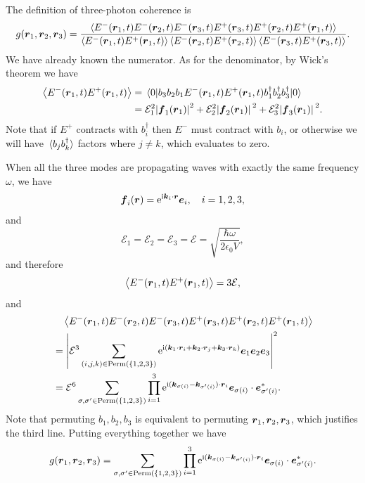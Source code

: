 \documentclass[hyperref, a4paper]{article}
\newcommand*{\ii}{\mathrm{i}}
\newcommand*{\ee}{\mathrm{e}}
\begin{document}
The definition of three-photon coherence is 
\begin{equation}
    g(\vb*{r}_1, \vb*{r}_2, \vb*{r}_3) = \frac{\expval{E^-(\vb*{r}_1, t) E^-(\vb*{r}_2, t) E^-(\vb*{r}_3, t) E^+(\vb*{r}_3, t) E^+(\vb*{r}_2, t) E^+(\vb*{r}_1, t)}}{\expval{E^-(\vb*{r}_1, t) E^+(\vb*{r}_1, t)} \expval{E^-(\vb*{r}_2, t) E^+(\vb*{r}_2, t)} \expval{E^-(\vb*{r}_3, t) E^+(\vb*{r}_3, t)}}.
\end{equation}
We have already known the numerator. As for the denominator, by Wick's theorem we have
\begin{equation}
    \begin{aligned}
        \expval{E^-(\vb*{r}_1, t) E^+(\vb*{r}_1, t)} &= \mel{0}{b_3 b_2 b_1 E^-(\vb*{r}_1, t) E^+(\vb*{r}_1, t) b_1^\dagger b_2^\dagger b_3^\dagger}{0} \\
        &= \mathcal{E}_1^2 \abs{\vb*{f}_1(\vb*{r}_1)}^2 + \mathcal{E}_2^2 \abs*{\vb*{f}_2(\vb*{r}_1)}^2 + \mathcal{E}_3^2 \abs*{\vb*{f}_3(\vb*{r}_1)}^2.
    \end{aligned}
\end{equation}
Note that if $E^+$ contracts with $b_i^\dagger$ then $E^-$ must contract with $b_i$, or otherwise we will have $\expval*{b_j b_k^\dagger}$ factors where $j \neq k$, which evaluates to zero.

When all the three modes are propagating waves with exactly the same frequency $\omega$, we have
\[
    \vb*{f}_i(\vb*{r}) = \ee^{\ii \vb*{k}_i \cdot \vb*{r}} \vb*{e}_i, \quad i = 1, 2, 3,
\]
and 
\[
    \mathcal{E}_1 = \mathcal{E}_2 = \mathcal{E}_3 = \mathcal{E} = \sqrt{\frac{\hbar \omega}{2 \epsilon_0 V}},
\]
and therefore
\[
    \expval{E^-(\vb*{r}_1, t) E^+(\vb*{r}_1, t)} = 3 \mathcal{E},
\]
and 
\[
    \begin{aligned}
        &\quad \expval{E^-(\vb*{r}_1, t) E^-(\vb*{r}_2, t) E^-(\vb*{r}_3, t) E^+(\vb*{r}_3, t) E^+(\vb*{r}_2, t) E^+(\vb*{r}_1, t)} \\
        &= \abs{\mathcal{E}^3 \sum_{(i, j, k) \in \mathrm{Perm}(\{1, 2, 3\})}  \ee^{\ii (\vb*{k}_1 \cdot \vb*{r}_i + \vb*{k}_2 \cdot \vb*{r}_j + \vb*{k}_3 \cdot \vb*{r}_k )} \vb*{e}_1 \vb*{e}_2 \vb*{e}_3}^2 \\
        &= \mathcal{E}^6 \sum_{\sigma, \sigma' \in \mathrm{Perm}(\{1, 2, 3\})} \prod_{i=1}^3 \ee^{\ii (\vb*{k}_{\sigma(i)} - \vb*{k}_{\sigma'(i)}) \cdot \vb*{r}_i } \vb*{e}_{\sigma(i)} \cdot \vb*{e}_{\sigma'(i)}^*.
    \end{aligned}
\]
Note that permuting $b_1, b_2, b_3$ is equivalent to permuting $\vb*{r}_1, \vb*{r}_2, \vb*{r}_3$, which justifies the third line.
Putting everything together we have
\begin{equation}
    g(\vb*{r}_1, \vb*{r}_2, \vb*{r}_3) = \sum_{\sigma, \sigma' \in \mathrm{Perm}(\{1, 2, 3\})} \prod_{i=1}^3 \ee^{\ii (\vb*{k}_{\sigma(i)} - \vb*{k}_{\sigma'(i)}) \cdot \vb*{r}_i } \vb*{e}_{\sigma(i)} \cdot \vb*{e}_{\sigma'(i)}^*.
\end{equation}


 
\end{document}
